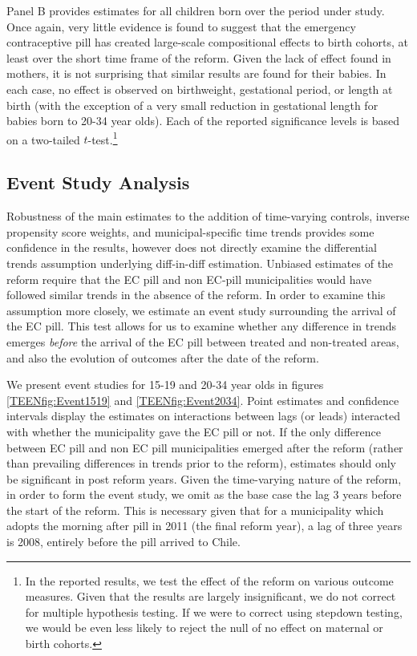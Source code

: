 Panel B provides estimates for all children born over the period under study.
Once again, very little evidence is found to suggest that the emergency 
contraceptive pill has created large-scale compositional effects to birth
cohorts, at least over the short time frame of the reform.  Given the lack of 
effect found in mothers, it is not surprising that similar results are found 
for their babies.  In each case, no effect is observed on birthweight, 
gestational period, or length at birth (with the exception of a very small 
reduction in gestational length for babies born to 20-34 year olds).  Each of 
the reported significance levels is based on a two-tailed $t$-test.\footnote{In
the reported results, we test the effect of the reform on various outcome 
measures.  Given that the results are largely insignificant, we do not correct 
for multiple hypothesis testing.  If we were to correct using stepdown testing,
we would be even less likely to reject the null of no effect on maternal or
birth cohorts.}  


\subsection{Event Study Analysis}
\label{TEENsscn:eventstudy}
Robustness of the main estimates to the addition of time-varying controls, 
inverse propensity score weights, and municipal-specific time trends provides 
some confidence in the results, however does not directly examine the
differential trends assumption underlying diff-in-diff estimation.  Unbiased 
estimates of the reform require that the EC pill and non EC-pill municipalities 
would have followed similar trends in the absence of the reform.  In order to 
examine this assumption more closely, we estimate an event study surrounding the 
arrival of the EC pill.  This test allows for us to examine whether any 
difference in trends emerges \emph{before} the arrival of the EC pill between 
treated and non-treated areas, and also the evolution of outcomes after the date 
of the reform.

We present event studies for 15-19 and 20-34 year olds in figures 
\ref{TEENfig:Event1519} and \ref{TEENfig:Event2034}.  Point estimates and 
confidence intervals display the estimates on interactions between lags (or 
leads) interacted with whether the municipality gave the EC pill or not.  If the
only difference between EC pill and non EC pill municipalities emerged after the
reform (rather than prevailing differences in trends prior to the reform), 
estimates should only be significant in post reform years. Given the time-varying
nature of the reform, in order to form the event study, we omit as the base case
the lag 3 years before the start of the reform.  This is necessary given that for
a municipality which adopts the morning after pill in 2011 (the final reform 
year), a lag of three years is 2008, entirely before the pill arrived to Chile.

